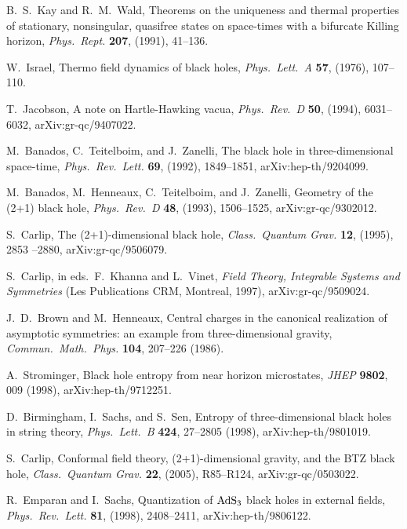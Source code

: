 \documentclass[12pt]{article}
\begin{document}
\begin{thebibliography}{999}
 B.\ S.\ Kay and R.\ M.\ Wald, Theorems on the 
uniqueness and thermal properties of stationary, nonsingular, 
quasifree states on space-times with a bifurcate Killing horizon,
\emph{Phys.\ Rept.} {\bf 207}, (1991), 41--136.

 W.\ Israel, Thermo field dynamics of black holes,
\emph{Phys.\ Lett.\ A} {\bf 57}, (1976), 107--110.

 T.\ Jacobson, A note on Hartle-Hawking vacua,
\emph{Phys.\ Rev.\ D} {\bf 50}, (1994), 6031--6032, 
arXiv:gr-qc/9407022.

 M.\ Banados, C.\ Teitelboim, and J.\ Zanelli, 
The black hole in three-dimensional space-time, \emph{Phys.\ 
Rev.\ Lett.} {\bf 69}, (1992), 1849--1851, arXiv:hep-th/9204099.

 M.\ Banados, M.\ Henneaux, C.\ Teitelboim, 
and J.\ Zanelli, Geometry of the (2+1) black hole, \emph{Phys.\
Rev.\ D} {\bf 48}, (1993), 1506--1525, arXiv:gr-qc/9302012.

  S.\ Carlip, The (2+1)-dimensional black hole,
\emph{Class.\ Quantum Grav.} {\bf 12}, (1995), 2853 --2880,
 arXiv:gr-qc/9506079.

 S.\ Carlip, in eds.\ F.\ Khanna and L.\ Vinet,
\emph{Field Theory, Integrable Systems and Symmetries}
(Les Publications CRM, Montreal, 1997), arXiv:gr-qc/9509024.

 J.~D.\ Brown and M.\ Henneaux, Central charges 
in the canonical realization of asymptotic symmetries: an example 
from three-dimensional gravity, \emph{Commun.\ Math.\ 
 Phys.} {\bf 104}, 207--226 (1986).

\bibitem{Strominger} A.\ Strominger, Black hole entropy from near 
horizon microstates, \emph{JHEP} {\bf 9802}, 009 (1998),  
arXiv:hep-th/9712251.

\bibitem{BSS} D.\ Birmingham, I.\ Sachs, and S.\ Sen, Entropy of 
three-dimensional black holes in string theory, \emph{Phys.\ Lett.\ B}
 {\bf 424}, 27--2805 (1998), arXiv:hep-th/9801019.

\bibitem{CarlipBTZb} S.\ Carlip, Conformal field theory, 
(2+1)-dimensional gravity, and the BTZ black hole, \emph{Class.\
Quantum Grav.} {\bf 22}, (2005), R85--R124, arXiv:gr-qc/0503022.

\bibitem{ES} R.\ Emparan and I.\ Sachs, Quantization of $\hbox{AdS}_3$ 
black holes in external fields, \emph{Phys.\ Rev.\ Lett.} {\bf 81}, (1998), 
2408--2411, arXiv:hep-th/9806122.


\end{thebibliography}
\end{document}
